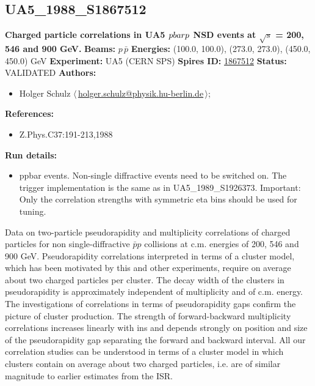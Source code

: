 \subsection[UA5\_1988\_S1867512]{UA5\_1988\_S1867512\,\cite{Ansorge:1988fg}}
\textbf{Charged particle correlations in UA5 $p \\bar{p}$ NSD events at \ensuremath{\sqrt{s}} = 200, 546 and 900 GeV.}\newline
\textbf{Beams:} $p$\,$\bar{p}$ \newline
\textbf{Energies:} (100.0, 100.0), (273.0, 273.0), (450.0, 450.0) GeV \newline
\textbf{Experiment:} UA5 (CERN SPS) \newline
\textbf{Spires ID:} \href{http://www.slac.stanford.edu/spires/find/hep/www?rawcmd=key+1867512}{1867512}\newline
\textbf{Status:} VALIDATED\newline
\textbf{Authors:}
\begin{itemize}
  \item Holger Schulz $\langle\,$\href{mailto:holger.schulz@physik.hu-berlin.de}{holger.schulz@physik.hu-berlin.de}$\,\rangle$;
\end{itemize}
\textbf{References:}
\begin{itemize}
  \item Z.Phys.C37:191-213,1988
\end{itemize}
\textbf{Run details:}
\begin{itemize}

  \item ppbar events. Non-single diffractive events need to be switched on. The trigger implementation is the same as in UA5_1989_S1926373. Important: Only the correlation strengths with symmetric eta bins should be used for tuning.\end{itemize}

\noindent Data on two-particle pseudorapidity and multiplicity correlations of charged particles for non single-diffractive $\bar{p}p$ collisions at c.m. energies of 200, 546 and 900 GeV. Pseudorapidity correlations interpreted in terms of a cluster model, which has been motivated by this and other experiments, require on average about two charged particles per cluster. The decay width of the clusters in pseudorapidity is approximately independent of multiplicity and of c.m. energy. The investigations of correlations in terms of pseudorapidity gaps confirm the picture of cluster production. The strength of forward-backward multiplicity correlations increases linearly with ins and depends strongly on position and size of the pseudorapidity gap separating the forward and backward interval. All our correlation studies can be understood in terms of a cluster model in which clusters contain on average about two charged particles, i.e. are of similar magnitude to earlier estimates from the ISR.

